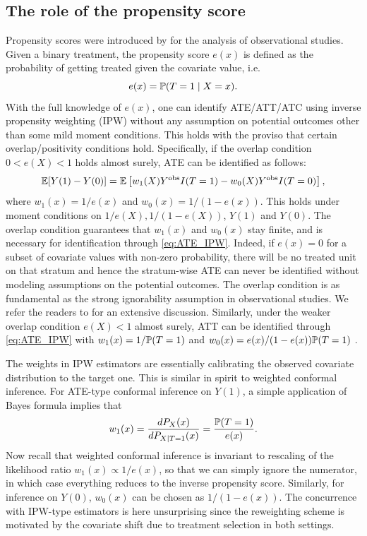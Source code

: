 \subsection{The role of the propensity score}
Propensity scores were introduced by \cite{rosenbaum1983central} for
the analysis of observational studies. Given a binary treatment, the
propensity score $e(x)$ is defined as the probability of getting
treated given the covariate value, i.e.
\[e(x) = \P(T = 1\mid X = x).\]
With the full knowledge of $e(x)$, one can identify ATE/ATT/ATC
using inverse propensity weighting (IPW)
\citep{imbens2015causal} without any assumption on potential outcomes
other than some mild moment conditions. This holds with the proviso
that certain overlap/positivity conditions hold. Specifically, if the
overlap condition $0 < e(X) < 1$ holds almost surely, ATE can be
identified as follows:
\begin{equation}
  \label{eq:ATE_IPW}
  \E[Y(1) - Y(0)] = \E \left[w_{1}(X)Y^{\obs}I(T = 1) - w_{0}(X)Y^{\obs}I(T = 0)\right],
\end{equation}
where $w_{1}(x) = 1 / e(x)$ and $w_{0}(x) = 1 / (1 - e(x))$.  This
holds under moment conditions on $1 / e(X) , 1 / (1 - e(X))$, $Y(1)$
and $Y(0)$.  The overlap condition guarantees that $w_{1}(x)$ and 
$w_{0}(x)$ stay finite, and is necessary for identification through
\eqref{eq:ATE_IPW}. %
Indeed, if $e(x) = 0$ for a subset of covariate values with non-zero
probability, there will be no treated unit on that stratum and hence
the stratum-wise ATE can never be identified without modeling
assumptions on the potential outcomes. The overlap condition is as
fundamental as the strong ignorability assumption in observational
studies. We refer the readers to \cite{d2017overlap} for an extensive
discussion. Similarly, under the weaker overlap condition $e(X) < 1$
almost surely, ATT can be identified through \eqref{eq:ATE_IPW} with
$w_{1}(x) = 1 / \P(T = 1)$ and $w_{0}(x) = e(x) / (1 - e(x)) \P(T = 1)$
\citep{hirano2003efficient}.%

The weights in IPW estimators are essentially calibrating the observed
covariate distribution to the target one. This is similar in spirit to
weighted conformal inference. For ATE-type conformal
inference on $Y(1)$, a simple application of Bayes formula implies
that
\[w_{1}(x) = \frac{dP_{X}(x)}{dP_{X\mid T = 1}(x)} = \frac{\P(T =
  1)}{e(x)}.\]
Now recall that weighted conformal inference is invariant to rescaling
of the likelihood ratio $w_{1}(x) \propto 1/e(x)$, so that we can
simply ignore the numerator, in which case everything reduces to the
inverse propensity score. Similarly, for inference on $Y(0)$,
$w_{0}(x)$ can be chosen as $1 / (1 - e(x))$. The concurrence with
IPW-type estimators is here unsurprising since the reweighting scheme
is motivated by the covariate shift due to treatment selection in both
settings.

